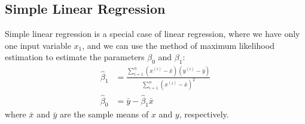 \documentclass{article}
\begin{document}
\subsection{Simple Linear Regression}
Simple linear regression is a special case of linear regression, where
we have only one input variable \(x_1\), and we can use the method of
maximum likelihood estimation to estimate the parameters \(\beta_0\)
and \(\beta_1\):
\begin{align*}
    \hat{\beta}_1 & = \frac{\sum_{i = 1}^n \left( x^{\left( i \right)} - \bar{x} \right) \left( y^{\left( i \right)} - \bar{y} \right)}{\sum_{i = 1}^n {\left( x^{\left( i \right)} - \bar{x} \right)}^2} \\
    \hat{\beta}_0 & = \bar{y} - \hat{\beta}_1 \bar{x}
\end{align*}
where \(\bar{x}\) and \(\bar{y}\) are the sample means of \(x\) and \(y\),
respectively.
\end{document}
